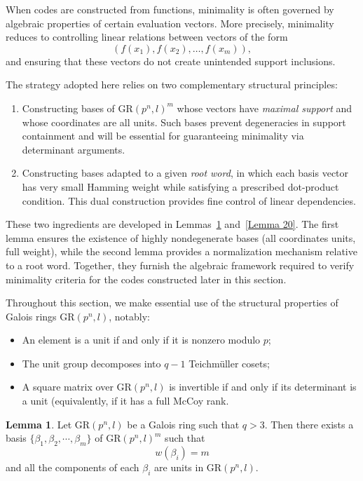 \documentclass[10pt]{article}
\theoremstyle{definition}
\newtheorem{lemma}[lem]{Lemma}
\begin{document}
When codes are constructed from functions, minimality is often governed by
algebraic properties of certain evaluation vectors.
More precisely, minimality reduces to controlling linear relations between
vectors of the form
\[
(f(x_1),f(x_2),\dots,f(x_m)),
\]
and ensuring that these vectors do not create unintended support inclusions.

The strategy adopted here relies on two complementary structural principles:

\begin{enumerate}
\item Constructing bases of $\mathrm{GR}(p^n,l)^m$ whose vectors have
      \emph{maximal support} and whose coordinates are all units.
      Such bases prevent degeneracies in support containment and will be
      essential for guaranteeing minimality via determinant arguments.

\item Constructing bases adapted to a given \emph{root word},
      in which each basis vector has very small Hamming weight
      while satisfying a prescribed dot-product condition.
      This dual construction provides fine control of linear dependencies.
\end{enumerate}

These two ingredients are developed in Lemmas~\ref{Lemma 19} and~\ref{Lemma 20}.
The first lemma ensures the existence of highly nondegenerate bases
(all coordinates units, full weight),
while the second lemma provides a normalization mechanism relative to a root word.
Together, they furnish the algebraic framework required to verify
minimality criteria for the codes constructed later in this section.

Throughout this section, we make essential use of the structural properties of
Galois rings $\mathrm{GR}(p^n,l)$, notably:

\begin{itemize}
\item An element is a unit if and only if it is nonzero modulo $p$;
\item The unit group decomposes into $q-1$ Teichmüller cosets;
\item A square matrix over $\mathrm{GR}(p^n,l)$ is invertible
      if and only if its determinant is a unit (equivalently,  if it has a full McCoy rank.
\end{itemize}



\begin{lemma}\label{Lemma 19}
Let $\mathrm{GR}(p^n,l)$ be a Galois ring such that $q>3$. Then there exists a basis
$\{\beta_1,\beta_2,\cdots,\beta_m\}$ of $\mathrm{GR}(p^n,l)^m$ such that
\[
w(\beta_i)=m
\]
and all the components of each $\beta_i$ are units in $\mathrm{GR}(p^n,l)$.
\end{lemma}
\end{document}
